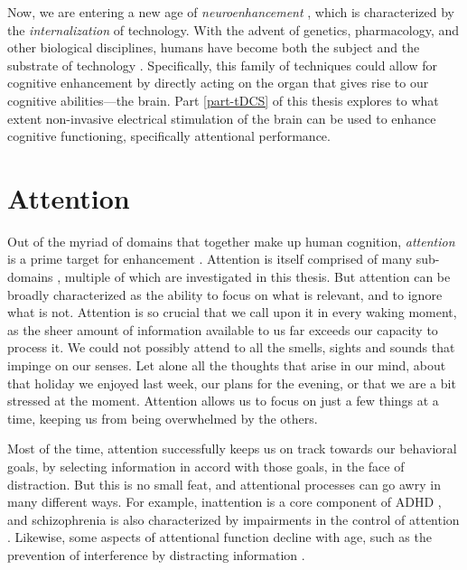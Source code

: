 \documentclass[11pt,]{memoir}
\begin{document}
Now, we are entering a new age of \emph{neuroenhancement} \autocite{Clark2014}, which is characterized by the \emph{internalization} of technology. With the advent of genetics, pharmacology, and other biological disciplines, humans have become both the subject and the substrate of technology \autocite{Stiegler1998}. Specifically, this family of techniques could allow for cognitive enhancement by directly acting on the organ that gives rise to our cognitive abilities---the brain. Part \ref{part-tDCS} of this thesis explores to what extent non-invasive electrical stimulation of the brain \autocites{CohenKadosh2014}{Dayan2013} can be used to enhance cognitive functioning, specifically attentional performance.

\hypertarget{attention}{%
\section{Attention}\label{attention}}

Out of the myriad of domains that together make up human cognition, \emph{attention} is a prime target for enhancement \autocite{Reteig2017}. Attention is itself comprised of many sub-domains \autocite{Chun2011}, multiple of which are investigated in this thesis. But attention can be broadly characterized as the ability to focus on what is relevant, and to ignore what is not. Attention is so crucial that we call upon it in every waking moment, as the sheer amount of information available to us far exceeds our capacity to process it. We could not possibly attend to all the smells, sights and sounds that impinge on our senses. Let alone all the thoughts that arise in our mind, about that holiday we enjoyed last week, our plans for the evening, or that we are a bit stressed at the moment. Attention allows us to focus on just a few things at a time, keeping us from being overwhelmed by the others.

Most of the time, attention successfully keeps us on track towards our behavioral goals, by selecting information in accord with those goals, in the face of distraction. But this is no small feat, and attentional processes can go awry in many different ways. For example, inattention is a core component of ADHD \autocite{AmericanPsychiatricAssociation2013}, and schizophrenia is also characterized by impairments in the control of attention \autocite{Luck2008}. Likewise, some aspects of attentional function decline with age, such as the prevention of interference by distracting information \autocite{McNab2015}.
\end{document}
